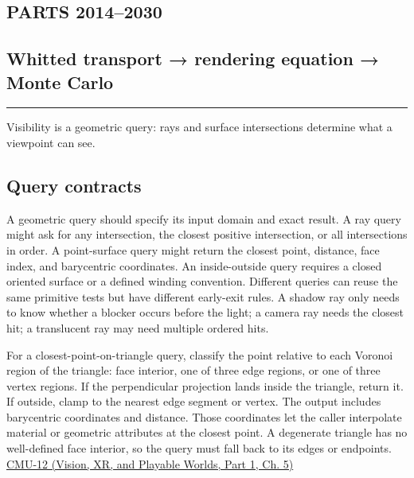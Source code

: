 \subsection{PARTS 2014--2030}\label{04-visual-computing-ii-ch028-parts-20142030}

\hypertarget{04-visual-computing-ii-ch028-parts-20142030}{}

\subsection{Whitted transport → rendering equation → Monte Carlo}\label{04-visual-computing-ii-ch028-whitted-transport-rendering-equation-monte-carlo}

\hypertarget{04-visual-computing-ii-ch028-whitted-transport-rendering-equation-monte-carlo}{}

\begin{center}\rule{0.5\linewidth}{0.5pt}\end{center}

Visibility is a geometric query: rays and surface intersections determine what a viewpoint can see.

\subsection{Query contracts}\label{04-visual-computing-ii-ch028-query-contracts}

\hypertarget{04-visual-computing-ii-ch028-query-contracts}{}

A geometric query should specify its input domain and exact result. A ray query might ask for any intersection, the closest positive intersection, or all intersections in order. A point-surface query might return the closest point, distance, face index, and barycentric coordinates. An inside-outside query requires a closed oriented surface or a defined winding convention. Different queries can reuse the same primitive tests but have different early-exit rules. A shadow ray only needs to know whether a blocker occurs before the light; a camera ray needs the closest hit; a translucent ray may need multiple ordered hits.

For a closest-point-on-triangle query, classify the point relative to each Voronoi region of the triangle: face interior, one of three edge regions, or one of three vertex regions. If the perpendicular projection lands inside the triangle, return it. If outside, clamp to the nearest edge segment or vertex. The output includes barycentric coordinates and distance. Those coordinates let the caller interpolate material or geometric attributes at the closest point. A degenerate triangle has no well-defined face interior, so the query must fall back to its edges or endpoints. \href{../07-Vision-XR-and-Playable-Worlds-P01/main.pdf\#nameddest=04-visual-computing-ii-ch036-cmu-12---geometric-queries}{CMU-12 (Vision, XR, and Playable Worlds, Part 1, Ch. 5)}

